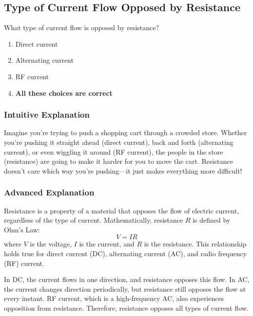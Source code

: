 \subsection{Type of Current Flow Opposed by Resistance}
\label{T5A11}

\begin{tcolorbox}[colback=gray!10!white,colframe=black!75!black,title=T5A11]
What type of current flow is opposed by resistance?
\begin{enumerate}[label=\Alph*]
    \item Direct current
    \item Alternating current
    \item RF current
    \item \textbf{All these choices are correct}
\end{enumerate}
\end{tcolorbox}

\subsubsection{Intuitive Explanation}
Imagine you're trying to push a shopping cart through a crowded store. Whether you're pushing it straight ahead (direct current), back and forth (alternating current), or even wiggling it around (RF current), the people in the store (resistance) are going to make it harder for you to move the cart. Resistance doesn't care which way you're pushing—it just makes everything more difficult!

\subsubsection{Advanced Explanation}
Resistance is a property of a material that opposes the flow of electric current, regardless of the type of current. Mathematically, resistance \( R \) is defined by Ohm's Law:
\[
V = IR
\]
where \( V \) is the voltage, \( I \) is the current, and \( R \) is the resistance. This relationship holds true for direct current (DC), alternating current (AC), and radio frequency (RF) current. 

In DC, the current flows in one direction, and resistance opposes this flow. In AC, the current changes direction periodically, but resistance still opposes the flow at every instant. RF current, which is a high-frequency AC, also experiences opposition from resistance. Therefore, resistance opposes all types of current flow.

